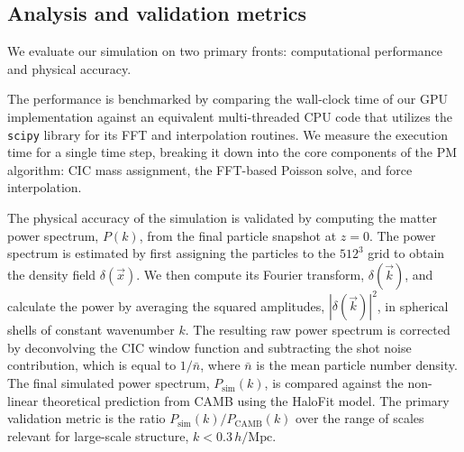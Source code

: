 \documentclass[]{article}
\begin{document}
\subsection{Analysis and validation metrics}

We evaluate our simulation on two primary fronts: computational performance and physical accuracy.

The performance is benchmarked by comparing the wall-clock time of our GPU implementation against an equivalent multi-threaded CPU code that utilizes the \texttt{scipy} library for its FFT and interpolation routines. We measure the execution time for a single time step, breaking it down into the core components of the PM algorithm: CIC mass assignment, the FFT-based Poisson solve, and force interpolation.

The physical accuracy of the simulation is validated by computing the matter power spectrum, $P(k)$, from the final particle snapshot at $z=0$. The power spectrum is estimated by first assigning the particles to the $512^3$ grid to obtain the density field $\delta(\vec{x})$. We then compute its Fourier transform, $\delta(\vec{k})$, and calculate the power by averaging the squared amplitudes, $|\delta(\vec{k})|^2$, in spherical shells of constant wavenumber $k$. The resulting raw power spectrum is corrected by deconvolving the CIC window function and subtracting the shot noise contribution, which is equal to $1/\bar{n}$, where $\bar{n}$ is the mean particle number density. The final simulated power spectrum, $P_{\text{sim}}(k)$, is compared against the non-linear theoretical prediction from CAMB using the HaloFit model. The primary validation metric is the ratio $P_{\text{sim}}(k) / P_{\text{CAMB}}(k)$ over the range of scales relevant for large-scale structure, $k < 0.3 \, h/\text{Mpc}$.
\end{document}
